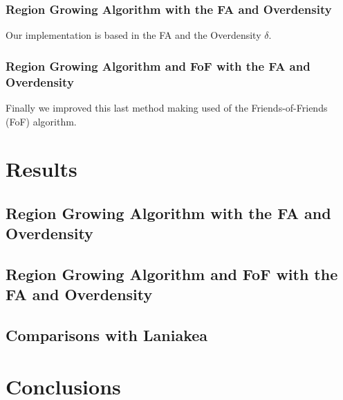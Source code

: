 \documentclass[12pt]{article}
\begin{document}







\subsubsection{Region Growing Algorithm with the FA and Overdensity}
Our implementation is based in the FA and the Overdensity $\delta$.

\subsubsection{Region Growing Algorithm and FoF with the FA and Overdensity}
Finally we improved this last method making used of the Friends-of-Friends (FoF) algorithm.





\section{Results}


\subsection{Region Growing Algorithm with the FA and Overdensity}

\subsection{Region Growing Algorithm and FoF with the FA and Overdensity}

\subsection{Comparisons with Laniakea}

\section{Conclusions}

\end{document}
